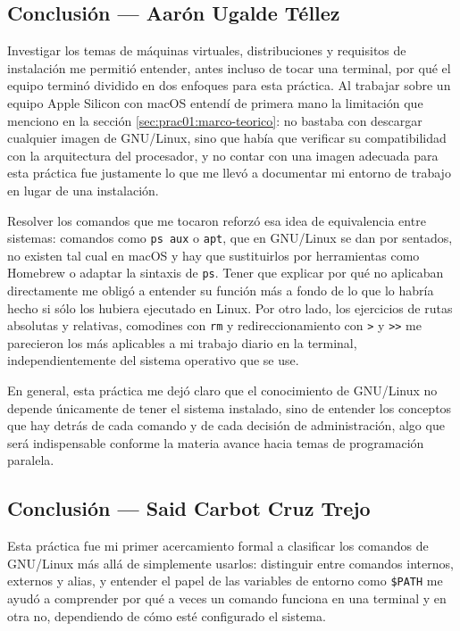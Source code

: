 \subsection{Conclusión — Aarón Ugalde Téllez}
\label{sec:prac01:concl:aaron}

Investigar los temas de máquinas virtuales, distribuciones y requisitos de instalación me permitió entender, antes incluso de tocar una terminal, por qué el equipo terminó dividido en dos enfoques para esta práctica. Al trabajar sobre un equipo Apple Silicon con macOS entendí de primera mano la limitación que menciono en la sección \ref{sec:prac01:marco-teorico}: no bastaba con descargar cualquier imagen de GNU/Linux, sino que había que verificar su compatibilidad con la arquitectura del procesador, y no contar con una imagen adecuada para esta práctica fue justamente lo que me llevó a documentar mi entorno de trabajo en lugar de una instalación.

Resolver los comandos que me tocaron reforzó esa idea de equivalencia entre sistemas: comandos como \texttt{ps aux} o \texttt{apt}, que en GNU/Linux se dan por sentados, no existen tal cual en macOS y hay que sustituirlos por herramientas como Homebrew o adaptar la sintaxis de \texttt{ps}. Tener que explicar por qué no aplicaban directamente me obligó a entender su función más a fondo de lo que lo habría hecho si sólo los hubiera ejecutado en Linux. Por otro lado, los ejercicios de rutas absolutas y relativas, comodines con \texttt{rm} y redireccionamiento con \texttt{>} y \texttt{>>} me parecieron los más aplicables a mi trabajo diario en la terminal, independientemente del sistema operativo que se use.

En general, esta práctica me dejó claro que el conocimiento de GNU/Linux no depende únicamente de tener el sistema instalado, sino de entender los conceptos que hay detrás de cada comando y de cada decisión de administración, algo que será indispensable conforme la materia avance hacia temas de programación paralela.

\subsection{Conclusión — Said Carbot Cruz Trejo}
\label{sec:prac01:concl:said}

Esta práctica fue mi primer acercamiento formal a clasificar los comandos de GNU/Linux más allá de simplemente usarlos: distinguir entre comandos internos, externos y alias, y entender el papel de las variables de entorno como \texttt{\$PATH} me ayudó a comprender por qué a veces un comando funciona en una terminal y en otra no, dependiendo de cómo esté configurado el sistema.

